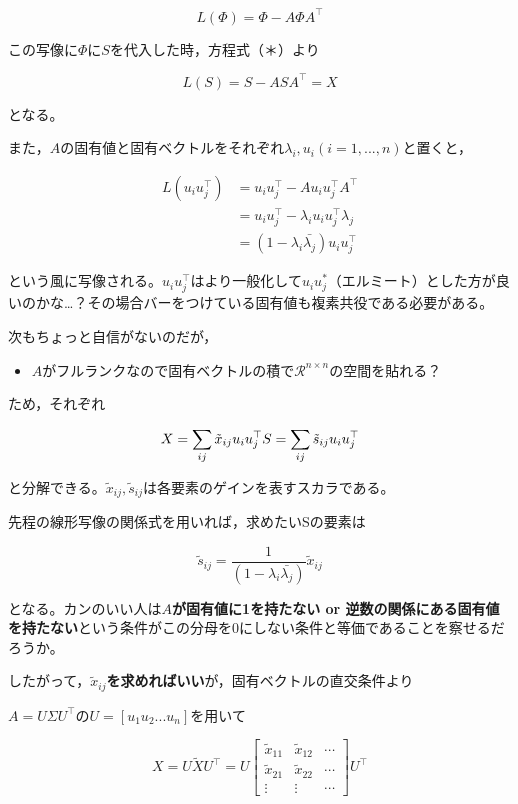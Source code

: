 \documentclass[11pt]{jsarticle}
\providecommand{\tightlist}{%
      \setlength{\itemsep}{0pt}\setlength{\parskip}{0pt}}
\begin{document}
\[
L(\Phi)=\Phi-A\Phi A^\top
\]

この写像に\(\Phi\)に\(S\)を代入した時，方程式（＊）より

\[
L(S)=S-ASA^\top=X
\]

となる。

また，\(A\)の固有値と固有ベクトルをそれぞれ\(\lambda_i, u_i (i=1,...,n)\)と置くと，

\begin{align}
L(u_iu_j^\top)&=u_iu_j^\top-Au_iu_j^\top A^\top\\
&=u_iu_j^\top-\lambda_iu_iu_j^\top\lambda_j\\
&=(1-\lambda_i\bar{\lambda_j}) u_iu_j^\top
\end{align}

という風に写像される。\(u_iu_j^\top\)はより一般化して\(u_iu_j^*\)（エルミート）とした方が良いのかな\ldots{}？その場合バーをつけている固有値も複素共役である必要がある。

次もちょっと自信がないのだが，

\begin{itemize}
\tightlist
\item
  \(A\)がフルランクなので固有ベクトルの積で\(\mathcal{R}^{n\times n}\)の空間を貼れる？
\end{itemize}

ため，それぞれ

\[
X=\sum_{ij} \tilde{x}_{ij} u_iu_j^\top\\
S=\sum_{ij} \tilde{s}_{ij} u_iu_j^\top
\]

と分解できる。\(\tilde{x}_{ij},\tilde{s}_{ij}\)は各要素のゲインを表すスカラである。

先程の線形写像の関係式を用いれば，求めたいSの要素は

\[
\tilde{s}_{ij} = \frac{1}{(1-\lambda_i\bar{\lambda_j})}\tilde{x}_{ij}
\]

となる。カンのいい人は\textbf{\(A\)が固有値に1を持たない or
逆数の関係にある固有値を持たない}という条件がこの分母を0にしない条件と等価であることを察せるだろうか。

したがって，\textbf{\(\tilde{x}_{ij}\)を求めればいい}が，固有ベクトルの直交条件より

\(A=U\Sigma U^\top\)の\(U=[u_1 u_2 ... u_n]\)を用いて

\[
X=U \tilde{X}U^\top = U\begin{bmatrix}
\tilde{x}_{11}&\tilde{x}_{12}& \cdots \\
\tilde{x}_{21}&\tilde{x}_{22}& \cdots \\
\vdots & \vdots & \cdots
\end{bmatrix}
U^\top
\]
\end{document}
